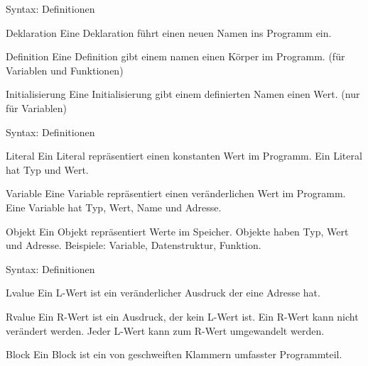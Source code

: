 \ifnum\conditionmacro=1 \documentclass[handout,usenames,dvipsnames]{beamer}\fi
\begin{document}
\begin{frame}{Syntax: Definitionen}

\begin{block}{Deklaration}
Eine Deklaration führt einen neuen Namen ins Programm ein.
\end{block}

\begin{block}{Definition}
Eine Definition gibt einem namen einen Körper im Programm. (für Variablen und Funktionen)
\end{block}

\begin{block}{Initialisierung}
Eine Initialisierung gibt einem definierten Namen einen Wert. (nur für Variablen)
\end{block}
\end{frame}

\begin{frame}{Syntax: Definitionen}
\begin{block}{Literal}
Ein Literal repräsentiert einen konstanten Wert im Programm. Ein Literal hat Typ und Wert.
\end{block}

\begin{block}{Variable}
Eine Variable repräsentiert einen veränderlichen Wert im Programm. Eine Variable hat Typ, Wert, Name und Adresse.
\end{block}

\begin{block}{Objekt}
Ein Objekt repräsentiert Werte im Speicher. Objekte haben Typ, Wert und Adresse. Beispiele: Variable, Datenstruktur, Funktion.
\end{block}

\end{frame}

\begin{frame}{Syntax: Definitionen}
\begin{block}{Lvalue}
Ein L-Wert ist ein veränderlicher Ausdruck der eine Adresse hat.
\end{block}

\begin{block}{Rvalue}
Ein R-Wert ist ein Ausdruck, der kein L-Wert ist. Ein R-Wert kann nicht verändert werden. Jeder L-Wert kann zum R-Wert umgewandelt werden.
\end{block}

\begin{block}{Block}
Ein Block ist ein von geschweiften Klammern umfasster Programmteil.
\end{block}

\end{frame}
\end{document}
